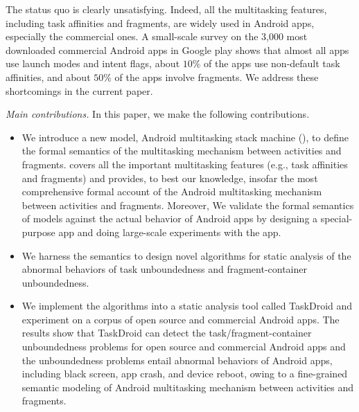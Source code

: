 The status quo is clearly unsatisfying. 
Indeed, all the multitasking features, including task affinities and fragments, are widely used in Android apps, especially the commercial ones. A small-scale survey on the 3,000 most downloaded commercial Android apps in Google play shows that almost all apps use launch modes and intent flags, about $10\%$ of the apps use non-default task affinities, and  about $50\%$ of the apps involve fragments. 
We address these shortcomings in the current paper. %
%

\medskip
\noindent\emph{Main contributions.} In this paper, we make the following contributions. %
\begin{itemize}[leftmargin=*]
\item We introduce a new model, Android multitasking stack machine (\AMASS), to define the formal semantics of the multitasking mechanism between activities and fragments. {\AMASS} covers all the important multitasking features (e.g., task affinities and fragments) and provides, to best our knowledge, insofar the most comprehensive formal account of the Android multitasking mechanism between activities and fragments. Moreover, We validate the formal semantics of {\AMASS} models against the actual behavior of  Android apps by designing a special-purpose app and doing large-scale experiments with the app. 
%
\item We harness the semantics to design novel algorithms for static analysis of the abnormal behaviors of task unboundedness and fragment-container unboundedness. %

\item We implement the algorithms into a static analysis tool called TaskDroid and experiment on a corpus of open source and commercial Android apps.  
The results show that TaskDroid can detect the task/fragment-container unboundedness problems for open source and commercial Android apps and the unboundedness problems entail abnormal behaviors of Android apps, including black screen, app crash, and device reboot, owing to a fine-grained semantic modeling of Android multitasking mechanism between activities and fragments.  %
\end{itemize}

